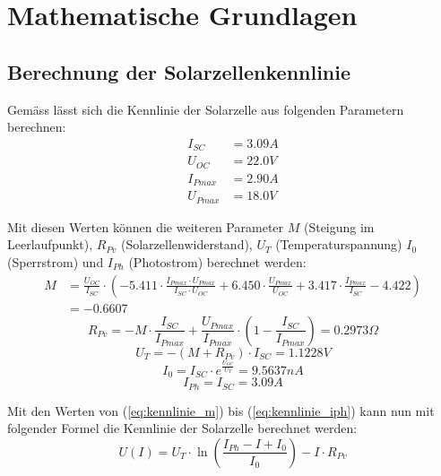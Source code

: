 \section{Mathematische Grundlagen}\label{subsec_mathe}

\subsection{Berechnung der Solarzellenkennlinie}

Gemäss \cite{photovoltaik_engineering} lässt sich die Kennlinie der Solarzelle aus folgenden Parametern berechnen:
\begin{align*}
	I_{SC} &= 3.09A \\
	U_{OC} &= 22.0V \\
	I_{Pmax} &= 2.90A \\
	U_{Pmax} &= 18.0V
\label{eq:eingangsparameter_kennlinie}
\end{align*}

Mit diesen Werten können die weiteren Parameter $M$ (Steigung im Leerlaufpunkt), $R_{Pv}$ (Solarzellenwiderstand), $U_T$ (Temperaturspannung) $I_0$ (Sperrstrom) und $I_{Ph}$ (Photostrom) berechnet werden:
\begin{equation}\begin{split}
	M&=\frac{U_{OC}}{I_{SC}}\cdot\left(-5.411\cdot\frac{I_{Pmax}\cdot U_{Pmax}}{I_{SC}\cdot U_{OC}}+6.450\cdot\frac{U_{Pmax}}{U_{OC}}+3.417\cdot\frac{I_{Pmax}}{I_{SC}}-4.422\right) \\
	&=-0.6607
\label{eq:kennlinie_m}
\end{split}\end{equation}
\begin{equation}
	R_{Pv}=-M\cdot\frac{I_{SC}}{I_{Pmax}}+\frac{U_{Pmax}}{I_{Pmax}}\cdot\left(1-\frac{I_{SC}}{I_{Pmax}}\right)=0.2973\Omega
\label{eq:kennlinie_rpv}
\end{equation}
\begin{equation}
	U_T=-\left(M+R_{Pv}\right)\cdot I_{SC}=1.1228V
\label{eq:kennlinie_ut}
\end{equation}
\begin{equation}
	I_0=I_{SC}\cdot e^{\frac{U_{OC}}{U_T}}=9.5637nA
\label{eq:}
\end{equation}
\begin{equation}
	I_{Ph}=I_{SC}=3.09A
\label{eq:kennlinie_iph}
\end{equation}

Mit den Werten von (\ref{eq:kennlinie_m}) bis (\ref{eq:kennlinie_iph}) kann nun mit folgender Formel die Kennlinie der Solarzelle berechnet werden:
\begin{equation}
	U\left(I\right)=U_T\cdot\ln\left(\frac{I_{Ph}-I+I_0}{I_0}\right)-I\cdot R_{Pv}
\label{eq:kennlinie}
\end{equation}


